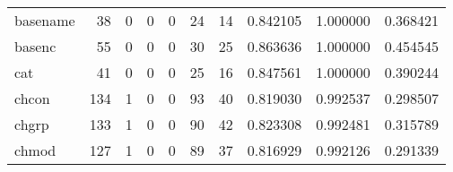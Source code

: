\begin{tabular}{lrrrrrrrrr}
basename  &                                        38 &                                                  0 &                                                  0 &                                                  0 &                                                 24 &                                                 14 &                                           0.842105 &                               1.000000 &                             0.368421 \\
basenc    &                                        55 &                                                  0 &                                                  0 &                                                  0 &                                                 30 &                                                 25 &                                           0.863636 &                               1.000000 &                             0.454545 \\
cat       &                                        41 &                                                  0 &                                                  0 &                                                  0 &                                                 25 &                                                 16 &                                           0.847561 &                               1.000000 &                             0.390244 \\
chcon     &                                       134 &                                                  1 &                                                  0 &                                                  0 &                                                 93 &                                                 40 &                                           0.819030 &                               0.992537 &                             0.298507 \\
chgrp     &                                       133 &                                                  1 &                                                  0 &                                                  0 &                                                 90 &                                                 42 &                                           0.823308 &                               0.992481 &                             0.315789 \\
chmod     &                                       127 &                                                  1 &                                                  0 &                                                  0 &                                                 89 &                                                 37 &                                           0.816929 &                               0.992126 &                             0.291339 \\

\end{tabular}
